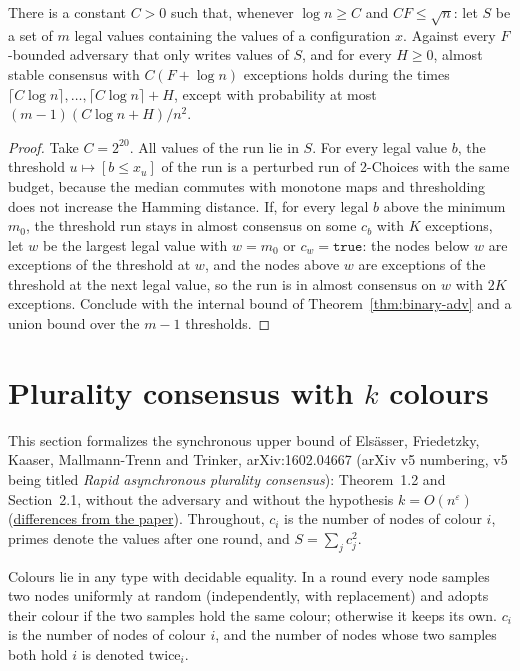 \begin{theorem}\label{thm:median-adv}
\leanok{}
There is a constant $C>0$ such that, whenever $\log n\ge C$ and $CF\le\sqrt n$: let $S$ be a set
of $m$ legal values containing the values of a configuration $x$. Against every $F$-bounded
adversary that only writes values of $S$, and for every $H\ge0$, almost stable consensus with
$C(F+\log n)$ exceptions holds during the times $\lceil C\log n\rceil,\dots,\lceil C\log n\rceil+H$,
except with probability at most $(m-1)(C\log n+H)/n^2$.
\end{theorem}
\begin{proof}\leanok
Take $C=2^{20}$. All values of the run lie in $S$. For every legal value $b$, the threshold
$u\mapsto[b\le x_u]$ of the run is a perturbed run of 2-Choices with the same budget, because the
median commutes with monotone maps and thresholding does not increase the Hamming distance. If,
for every legal $b$ above the minimum $m_0$, the threshold run stays in almost consensus on some
$c_b$ with $K$ exceptions, let $w$ be the largest legal value with $w=m_0$ or $c_w=\texttt{true}$:
the nodes below $w$ are exceptions of the threshold at $w$, and the nodes above $w$ are exceptions
of the threshold at the next legal value, so the run is in almost consensus on $w$ with $2K$
exceptions. Conclude with the internal bound of Theorem~\ref{thm:binary-adv} and a union bound
over the $m-1$ thresholds.
\end{proof}

\section{Plurality consensus with $k$ colours}\label{sec:efkmt-plurality}
This section formalizes the synchronous upper bound of Elsässer, Friedetzky, Kaaser,
Mallmann-Trenn and Trinker, arXiv:1602.04667 (arXiv v5 numbering, v5 being titled \emph{Rapid
asynchronous plurality consensus}): Theorem~1.2 and Section~2.1, without the adversary and without the
hypothesis $k=O(n^\varepsilon)$
(\href{https://github.com/formal-dynamics/leanamics/blob/main/median/FORMALIZATION_DIFFERENCES.md#plurality-consensus-with-k-colours-twochoices-roadmap-maj-4}{differences
from the paper}). Throughout, $c_i$ is the number of nodes of colour $i$, primes denote the values
after one round, and $S=\sum_j c_j^2$.

\begin{definition}\label{def:two-choices}
\leanok{}
Colours lie in any type with decidable equality. In a round every node samples two nodes uniformly
at random (independently, with replacement) and adopts their colour if the two samples hold the
same colour; otherwise it keeps its own. $c_i$ is the number of nodes of colour $i$, and the number
of nodes whose two samples both hold $i$ is denoted $\mathrm{twice}_i$.
\end{definition}

